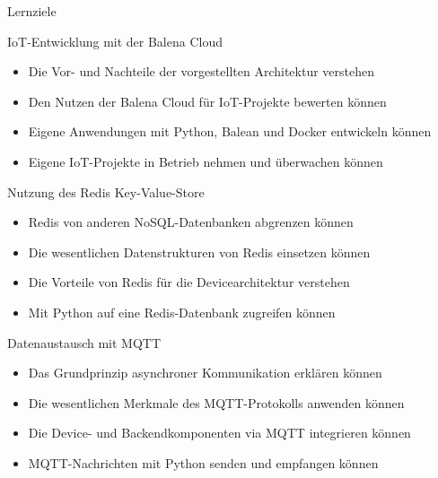 {
\scriptsize

\begin{frame}{Lernziele}
    \begin{block}{IoT-Entwicklung mit der Balena Cloud}
        \begin{itemize}
            \setlength\itemsep{.5em}

            \item Die Vor- und Nachteile der vorgestellten Architektur verstehen
            \item Den Nutzen der Balena Cloud für IoT-Projekte bewerten können
            \item Eigene Anwendungen mit Python, Balean und Docker entwickeln können
            \item Eigene IoT-Projekte in Betrieb nehmen und überwachen können
        \end{itemize}
    \end{block}

    \begin{block}{Nutzung des Redis Key-Value-Store}
        \begin{itemize}
            \setlength\itemsep{.5em}

            \item Redis von anderen NoSQL-Datenbanken abgrenzen können
            \item Die wesentlichen Datenstrukturen von Redis einsetzen können
            \item Die Vorteile von Redis für die Devicearchitektur verstehen
            \item Mit Python auf eine Redis-Datenbank zugreifen können
        \end{itemize}
    \end{block}

    \begin{block}{Datenaustausch mit MQTT}
        \begin{itemize}
            \setlength\itemsep{.5em}

            \item Das Grundprinzip asynchroner Kommunikation erklären können
            \item Die wesentlichen Merkmale des MQTT-Protokolls anwenden können
            \item Die Device- und Backendkomponenten via MQTT integrieren können
            \item MQTT-Nachrichten mit Python senden und empfangen können
        \end{itemize}
    \end{block}
\end{frame}
}

